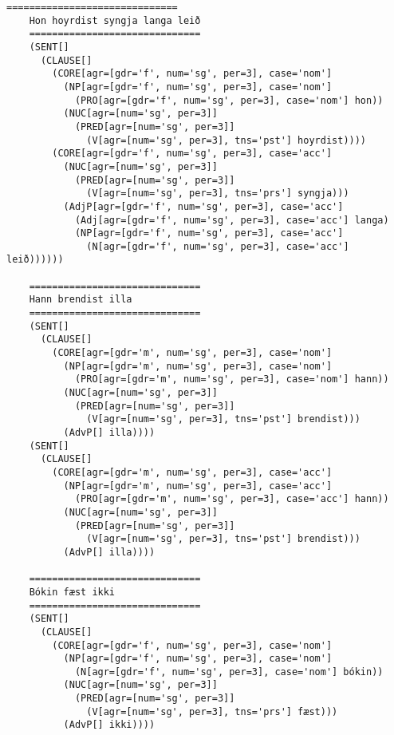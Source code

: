 \documentclass[12pt,%
]{lin-v2/lin}
\begin{document}
\begin{lstlisting}[caption={The parse trees returned by the parser.}, label=results]
    ==============================
    Hon hoyrdist syngja langa leið
    ==============================
    (SENT[]
      (CLAUSE[]
        (CORE[agr=[gdr='f', num='sg', per=3], case='nom']
          (NP[agr=[gdr='f', num='sg', per=3], case='nom']
            (PRO[agr=[gdr='f', num='sg', per=3], case='nom'] hon))
          (NUC[agr=[num='sg', per=3]]
            (PRED[agr=[num='sg', per=3]]
              (V[agr=[num='sg', per=3], tns='pst'] hoyrdist))))
        (CORE[agr=[gdr='f', num='sg', per=3], case='acc']
          (NUC[agr=[num='sg', per=3]]
            (PRED[agr=[num='sg', per=3]]
              (V[agr=[num='sg', per=3], tns='prs'] syngja)))
          (AdjP[agr=[gdr='f', num='sg', per=3], case='acc']
            (Adj[agr=[gdr='f', num='sg', per=3], case='acc'] langa)
            (NP[agr=[gdr='f', num='sg', per=3], case='acc']
              (N[agr=[gdr='f', num='sg', per=3], case='acc'] leið))))))
    
    ==============================
    Hann brendist illa
    ==============================
    (SENT[]
      (CLAUSE[]
        (CORE[agr=[gdr='m', num='sg', per=3], case='nom']
          (NP[agr=[gdr='m', num='sg', per=3], case='nom']
            (PRO[agr=[gdr='m', num='sg', per=3], case='nom'] hann))
          (NUC[agr=[num='sg', per=3]]
            (PRED[agr=[num='sg', per=3]]
              (V[agr=[num='sg', per=3], tns='pst'] brendist)))
          (AdvP[] illa))))
    (SENT[]
      (CLAUSE[]
        (CORE[agr=[gdr='m', num='sg', per=3], case='acc']
          (NP[agr=[gdr='m', num='sg', per=3], case='acc']
            (PRO[agr=[gdr='m', num='sg', per=3], case='acc'] hann))
          (NUC[agr=[num='sg', per=3]]
            (PRED[agr=[num='sg', per=3]]
              (V[agr=[num='sg', per=3], tns='pst'] brendist)))
          (AdvP[] illa))))
    
    ==============================
    Bókin fæst ikki
    ==============================
    (SENT[]
      (CLAUSE[]
        (CORE[agr=[gdr='f', num='sg', per=3], case='nom']
          (NP[agr=[gdr='f', num='sg', per=3], case='nom']
            (N[agr=[gdr='f', num='sg', per=3], case='nom'] bókin))
          (NUC[agr=[num='sg', per=3]]
            (PRED[agr=[num='sg', per=3]]
              (V[agr=[num='sg', per=3], tns='prs'] fæst)))
          (AdvP[] ikki))))
    

\end{lstlisting}
\end{document}
